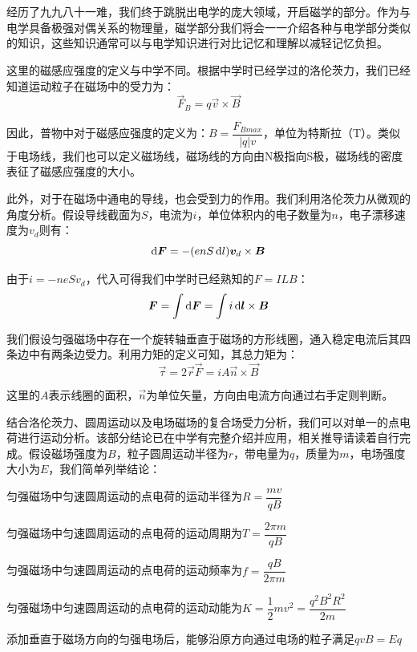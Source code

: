 \section[磁场]{}
经历了九九八十一难，我们终于跳脱出电学的庞大领域，开启磁学的部分。作为与电学具备极强对偶关系的物理量，磁学部分我们将会一一介绍各种与电学部分类似的知识，这些知识通常可以与电学知识进行对比记忆和理解以减轻记忆负担。

这里的磁感应强度的定义与中学不同。根据中学时已经学过的洛伦茨力，我们已经知道运动粒子在磁场中的受力为：
\[\vec{F}_B=q\vec{v}\times \vec{B}\]

因此，普物中对于磁感应强度的定义为：$B=\dfrac{F_{Bmax}}{|q|v}$，单位为特斯拉（T）。类似于电场线，我们也可以定义磁场线，磁场线的方向由N极指向S极，磁场线的密度表征了磁感应强度的大小。

此外，对于在磁场中通电的导线，也会受到力的作用。我们利用洛伦茨力从微观的角度分析。假设导线截面为$S$，电流为$i$，单位体积内的电子数量为$n$，电子漂移速度为$v_d$则有：
\[\dif{\vec{F}}=-(enS\dif{l})\vec{v}_d\times\vec{B}\]

由于$i=-neSv_d$，代入可得我们中学时已经熟知的$F=ILB$：
\[\vec{F}=\int \dif{\vec{F}}=\int i\dif{\vec{l}}\times\vec{B}\]

我们假设匀强磁场中存在一个旋转轴垂直于磁场的方形线圈，通入稳定电流后其四条边中有两条边受力。利用力矩的定义可知，其总力矩为：
\[\vec{\tau}=2\vec{r}\vec{F}=iA\vec{n}\times\vec{B}\]

这里的$A$表示线圈的面积，$\vec{n}$为单位矢量，方向由电流方向通过右手定则判断。

结合洛伦茨力、圆周运动以及电场磁场的复合场受力分析，我们可以对单一的点电荷进行运动分析。该部分结论已在中学有完整介绍并应用，相关推导请读着自行完成。假设磁场强度为$B$，粒子圆周运动半径为$r$，带电量为$q$，质量为$m$，电场强度大小为$E$，我们简单列举结论：
\begin{Itemize}
    \item 匀强磁场中匀速圆周运动的点电荷的运动半径为$R=\dfrac{mv}{qB}$
    \item 匀强磁场中匀速圆周运动的点电荷的运动周期为$T=\dfrac{2\pi m}{qB}$
    \item 匀强磁场中匀速圆周运动的点电荷的运动频率为$f=\dfrac{qB}{2\pi m}$
    \item 匀强磁场中匀速圆周运动的点电荷的运动动能为$K=\dfrac{1}{2}mv^2=\dfrac{q^2B^2R^2}{2m}$
    \item 添加垂直于磁场方向的匀强电场后，能够沿原方向通过电场的粒子满足$qvB=Eq$
\end{Itemize}

